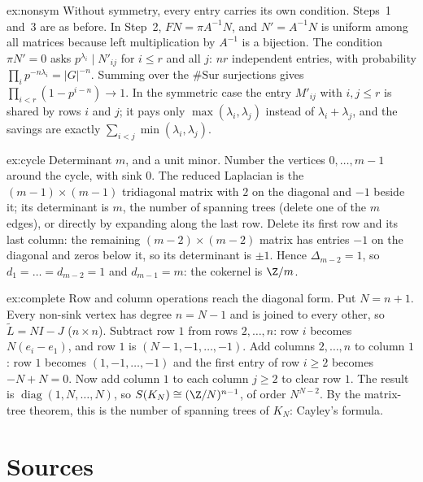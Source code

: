 \begin{solution}{ex:nonsym}
\idea Without symmetry, every entry carries its own condition.
\writeup Steps~1 and~3 are as before. In Step~2, $FN=\pi A^{-1}N$, and $N'=A^{-1}N$ is uniform among all matrices because left multiplication by $A^{-1}$ is a bijection. The condition $\pi N'=0$ asks $p^{\lambda_i}\mid N'_{ij}$ for $i\le r$ and all $j$: $nr$ independent entries, with probability $\prod_ip^{-n\lambda_i}=|G|^{-n}$. Summing over the $\#\mathrm{Sur}$ surjections gives $\prod_{i<r}(1-p^{i-n})\to1$. In the symmetric case the entry $M'_{ij}$ with $i,j\le r$ is shared by rows $i$ and $j$; it pays only $\max(\lambda_i,\lambda_j)$ instead of $\lambda_i+\lambda_j$, and the savings are exactly $\sum_{i<j}\min(\lambda_i,\lambda_j)$.
\end{solution}

\begin{solution}{ex:cycle}
\idea Determinant $m$, and a unit minor.
\writeup Number the vertices $0,\dots,m-1$ around the cycle, with sink $0$. The reduced Laplacian is the $(m-1)\times(m-1)$ tridiagonal matrix with $2$ on the diagonal and $-1$ beside it; its determinant is $m$, the number of spanning trees (delete one of the $m$ edges), or directly by expanding along the last row. Delete its first row and its last column: the remaining $(m-2)\times(m-2)$ matrix has entries $-1$ on the diagonal and zeros below it, so its determinant is $\pm1$. Hence $\Delta_{m-2}=1$, so $d_1=\dots=d_{m-2}=1$ and $d_{m-1}=m$: the cokernel is $\Z/m$.
\end{solution}

\begin{solution}{ex:complete}
\idea Row and column operations reach the diagonal form.
\writeup Put $N=n+1$. Every non-sink vertex has degree $n=N-1$ and is joined to every other, so $\tilde L=NI-J$ ($n\times n$). Subtract row $1$ from rows $2,\dots,n$: row $i$ becomes $N(e_i-e_1)$, and row $1$ is $(N-1,-1,\dots,-1)$. Add columns $2,\dots,n$ to column $1$: row $1$ becomes $(1,-1,\dots,-1)$ and the first entry of row $i\ge2$ becomes $-N+N=0$. Now add column $1$ to each column $j\ge2$ to clear row $1$. The result is $\operatorname{diag}(1,N,\dots,N)$, so $S(K_N)\cong(\Z/N)^{n-1}$, of order $N^{N-2}$. By the matrix-tree theorem, this is the number of spanning trees of $K_N$: Cayley's formula.
\end{solution}

\section{Sources}

